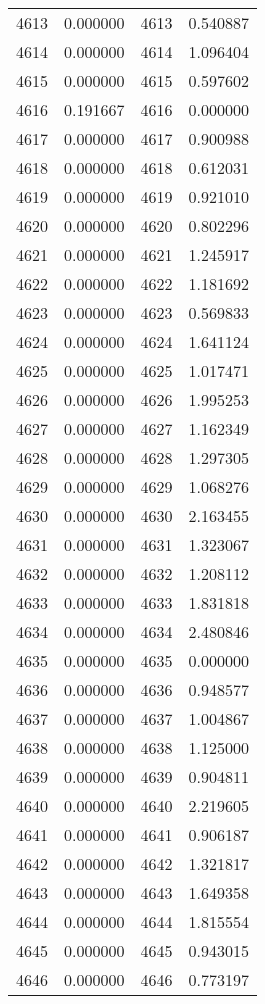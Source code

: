 \documentclass[12pt]{article}
\begin{document}
\begin{longtable}{@{}cccc@{}}
4613 & 0.000000 & 4613 & 0.540887 \\
4614 & 0.000000 & 4614 & 1.096404 \\
4615 & 0.000000 & 4615 & 0.597602 \\
4616 & 0.191667 & 4616 & 0.000000 \\
4617 & 0.000000 & 4617 & 0.900988 \\
4618 & 0.000000 & 4618 & 0.612031 \\
4619 & 0.000000 & 4619 & 0.921010 \\
4620 & 0.000000 & 4620 & 0.802296 \\
4621 & 0.000000 & 4621 & 1.245917 \\
4622 & 0.000000 & 4622 & 1.181692 \\
4623 & 0.000000 & 4623 & 0.569833 \\
4624 & 0.000000 & 4624 & 1.641124 \\
4625 & 0.000000 & 4625 & 1.017471 \\
4626 & 0.000000 & 4626 & 1.995253 \\
4627 & 0.000000 & 4627 & 1.162349 \\
4628 & 0.000000 & 4628 & 1.297305 \\
4629 & 0.000000 & 4629 & 1.068276 \\
4630 & 0.000000 & 4630 & 2.163455 \\
4631 & 0.000000 & 4631 & 1.323067 \\
4632 & 0.000000 & 4632 & 1.208112 \\
4633 & 0.000000 & 4633 & 1.831818 \\
4634 & 0.000000 & 4634 & 2.480846 \\
4635 & 0.000000 & 4635 & 0.000000 \\
4636 & 0.000000 & 4636 & 0.948577 \\
4637 & 0.000000 & 4637 & 1.004867 \\
4638 & 0.000000 & 4638 & 1.125000 \\
4639 & 0.000000 & 4639 & 0.904811 \\
4640 & 0.000000 & 4640 & 2.219605 \\
4641 & 0.000000 & 4641 & 0.906187 \\
4642 & 0.000000 & 4642 & 1.321817 \\
4643 & 0.000000 & 4643 & 1.649358 \\
4644 & 0.000000 & 4644 & 1.815554 \\
4645 & 0.000000 & 4645 & 0.943015 \\
4646 & 0.000000 & 4646 & 0.773197 \\

\end{longtable}
\end{document}
